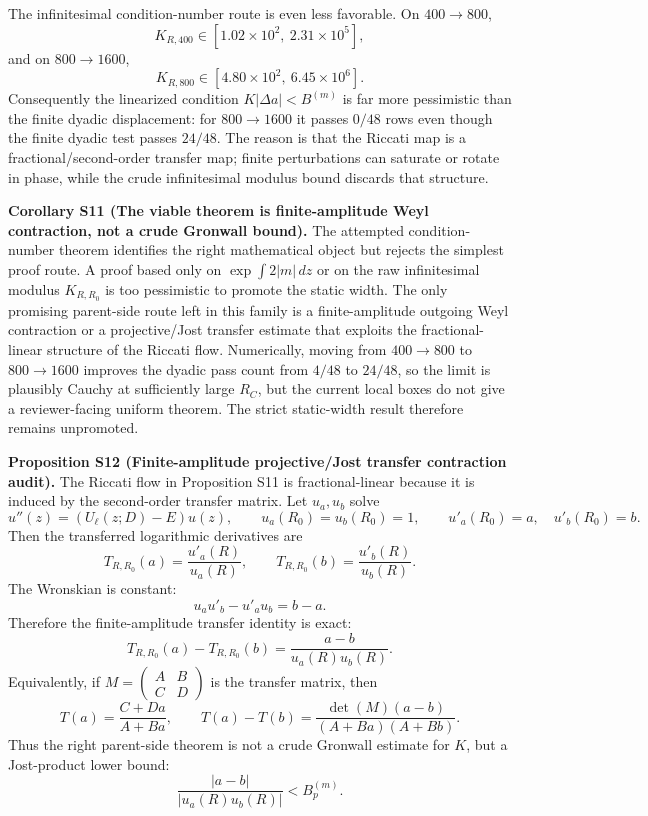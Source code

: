 \documentclass[aps,prd,onecolumn,notitlepage,nofootinbib,superscriptaddress,11pt,floatfix]{revtex4-2}
\begin{document}
The infinitesimal condition-number route is even less favorable.  On \(400\to800\),
\[
K_{R,400}\in[1.02\times10^2,\ 2.31\times10^5],
\]
and on \(800\to1600\),
\[
K_{R,800}\in[4.80\times10^2,\ 6.45\times10^6].
\]
Consequently the linearized condition \(K|\Delta a|<B^{(m)}\) is far more pessimistic than the finite dyadic displacement: for \(800\to1600\) it passes \(0/48\) rows even though the finite dyadic test passes \(24/48\).  The reason is that the Riccati map is a fractional/second-order transfer map; finite perturbations can saturate or rotate in phase, while the crude infinitesimal modulus bound discards that structure.

\medskip\noindent\textbf{Corollary S11 (The viable theorem is finite-amplitude Weyl contraction, not a crude Gronwall bound).}
The attempted condition-number theorem identifies the right mathematical object but rejects the simplest proof route.  A proof based only on \(\exp\int 2|m|\,dz\) or on the raw infinitesimal modulus \(K_{R,R_0}\) is too pessimistic to promote the static width.  The only promising parent-side route left in this family is a finite-amplitude outgoing Weyl contraction or a projective/Jost transfer estimate that exploits the fractional-linear structure of the Riccati flow.  Numerically, moving from \(400\to800\) to \(800\to1600\) improves the dyadic pass count from \(4/48\) to \(24/48\), so the limit is plausibly Cauchy at sufficiently large \(R_C\), but the current local boxes do not give a reviewer-facing uniform theorem.  The strict static-width result therefore remains unpromoted.

\medskip\noindent\textbf{Proposition S12 (Finite-amplitude projective/Jost transfer contraction audit).}
The Riccati flow in Proposition S11 is fractional-linear because it is induced by the second-order transfer matrix.  Let \(u_a,u_b\) solve
\[
u''(z)=(U_\ell(z;D)-E)u(z),\qquad
u_a(R_0)=u_b(R_0)=1,\qquad
u'_a(R_0)=a,\quad u'_b(R_0)=b .
\]
Then the transferred logarithmic derivatives are
\[
T_{R,R_0}(a)=\frac{u'_a(R)}{u_a(R)},\qquad
T_{R,R_0}(b)=\frac{u'_b(R)}{u_b(R)}.
\]
The Wronskian is constant:
\[
u_a u'_b-u'_a u_b=b-a.
\]
Therefore the finite-amplitude transfer identity is exact:
\[
T_{R,R_0}(a)-T_{R,R_0}(b)
=
\frac{a-b}{u_a(R)u_b(R)} .
\]
Equivalently, if \(M=\left(\begin{smallmatrix}A&B\\ C&D\end{smallmatrix}\right)\) is the transfer matrix, then
\[
T(a)=\frac{C+Da}{A+Ba},\qquad
T(a)-T(b)=
\frac{\det(M)(a-b)}{(A+Ba)(A+Bb)}.
\]
Thus the right parent-side theorem is not a crude Gronwall estimate for \(K\), but a Jost-product lower bound:
\[
\frac{|a-b|}{|u_a(R)u_b(R)|}<B_p^{(m)} .
\]
\end{document}
